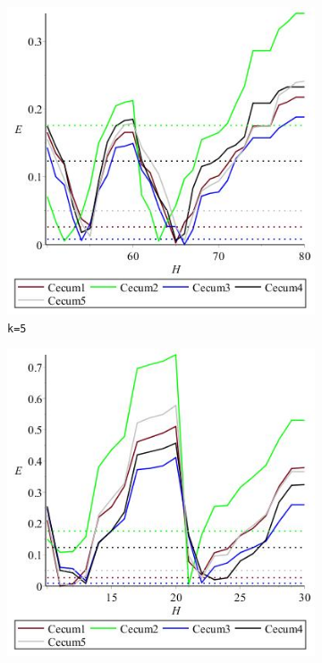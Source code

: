 \documentclass[../../main.tex]{subfiles}
\begin{document}
\begin{figure}[H]
\begin{subfigure}[b]{.5\textwidth}
\includegraphics[width=\textwidth]{precision/minmax/k5cecum}
\caption{\texttt{k=5}}
\end{subfigure}
\begin{subfigure}[b]{.5\textwidth}
\includegraphics[width=\textwidth]{precision/minmax/k6cecum}

\end{subfigure}
\end{figure}
\end{document}
